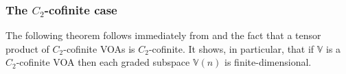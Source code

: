 \documentclass[11pt,b5paper,notitlepage]{article}
\theoremstyle{definition}
\theoremstyle{plain}
\newtheorem{pp}[df]{Proposition}
\newcommand{\wtd}{\widetilde}
\newcommand{\mbf}{\mathbf}
\newcommand{\Vbb}{\mathbb V}
\newcommand{\Wbb}{\mathbb W}
\newcommand{\Cbb}{\mathbb C}
\newcommand{\Nbb}{\mathbb N}
\newcommand{\Zbb}{\mathbb Z}
\newcommand{\<}{\left\langle}
\renewcommand{\>}{\right\rangle}
\numberwithin{equation}{subsection}
\begin{document}
\begin{comment}
Conversely, one may wonder whether a generalized $\Vbb_1\otimes\cdots\otimes\Vbb_N$-module is a finitely-admissible $\Vbb_1\times\cdots\times\Vbb_N$-module so that the main results about (partial) conformal blocks in this article can be applied to it. Here is one criterion:

\begin{pp}\label{lb46}
Let $\Wbb$ be a finitely-generated grading-restricted $\Vbb_1\otimes\cdots\otimes\Vbb_N$-module of countable dimension. Then $\Wbb$ is a finitely-admissible $\Vbb_1\times\cdots\times\Vbb_N$-module.
\end{pp}

Note that the assumption on countable dimension is redundant if the $L(0)$-graded subspaces of $\Vbb_1,\dots,\Vbb_N$ are finite-dimensional.

\begin{proof}



$E\subset\Cbb^N$ such that
\begin{align*}
\Wbb=\bigoplus_{(s_1,\dots,s_N)\in E+\Nbb^N} \Wbb_{[s_1,\dots,s_N]}
\end{align*}
that any two elements of $E$ do not differ by an element of $\Zbb^N$, and that each $\Wbb_{\alpha,[s_1,\dots,s_N]}$ is finite dimensional. We write $E=\{\mbf e_1,\mbf e_2,\dots\}$ where $\mbf e_k=(e_{k,1},\dots,e_{k,N})\in\Cbb^N$. Define a linear operator $\wtd L_i(0)$ on $\Wbb$ by
\begin{align*}
\wtd L_i(0)=k+s_i-e_{k,i} \qquad\text{ on }\Wbb_{[s_1,\dots,s_N]}\text{ if }(s_1,\dots,s_N)\in\mbf e_k+\Nbb^N
\end{align*} 
Then $\wtd L_1(0),\dots,\wtd L_N(0)$ make $\Wbb$ a finitely-admissible $\Vbb_1\times\cdots\times\Vbb_N$-module.
\end{proof}
\end{comment}













\subsubsection{The $C_2$-cofinite case}


The following theorem follows immediately from \cite[Lem. 2.4]{Miy-modular-invariance} and the fact that a tensor product of $C_2$-cofinite VOAs is $C_2$-cofinite. It shows, in particular, that if $\Vbb$ is a $C_2$-cofinite VOA then each graded subspace $\Vbb(n)$ is finite-dimensional.
\end{document}
